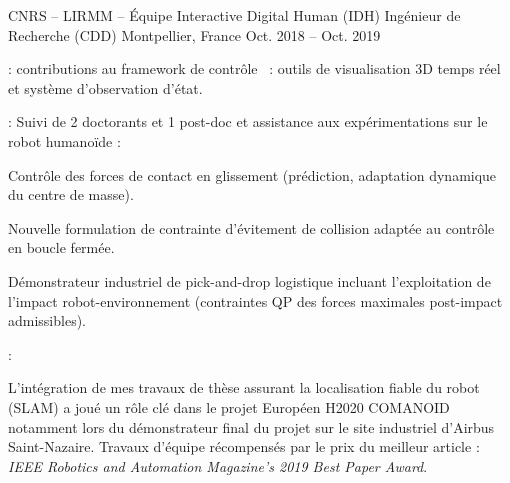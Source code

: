 \begin{cventries}
  \cventry
  {CNRS -- LIRMM -- Équipe Interactive Digital Human (IDH)} %
  {Ingénieur de Recherche (CDD)} %
  {Montpellier, France} %
  {Oct. 2018 -- Oct. 2019} %
  {
    \begin{cvitems} %
    \item {} : contributions au framework de contrôle~
      : outils de visualisation 3D temps réel et système d'observation d'état.
    \item {} : Suivi de 2 doctorants et 1 post-doc et assistance aux
      expérimentations sur le robot humanoïde  :
      \begin{subitems}
      \item Contrôle des forces de contact en glissement (prédiction, adaptation dynamique du centre de masse).
      \item Nouvelle formulation de contrainte d'évitement de collision adaptée au contrôle en boucle fermée.
      \item Démonstrateur industriel de pick-and-drop logistique incluant l'exploitation de l'impact
        robot-environnement (contraintes QP des forces maximales post-impact admissibles).
      \end{subitems}
    \item {} :
      \begin{subitems}
      \item L'intégration de mes travaux de thèse assurant la localisation fiable du robot (SLAM) a joué un
        rôle clé dans le projet Européen H2020 COMANOID notamment lors du démonstrateur final du projet sur
        le site industriel d'Airbus Saint-Nazaire. Travaux d'équipe récompensés par le prix du meilleur
        article : \emph{IEEE Robotics and Automation Magazine’s 2019 Best Paper Award}.
      \end{subitems}
    \end{cvitems}
  }
\end{cventries}

